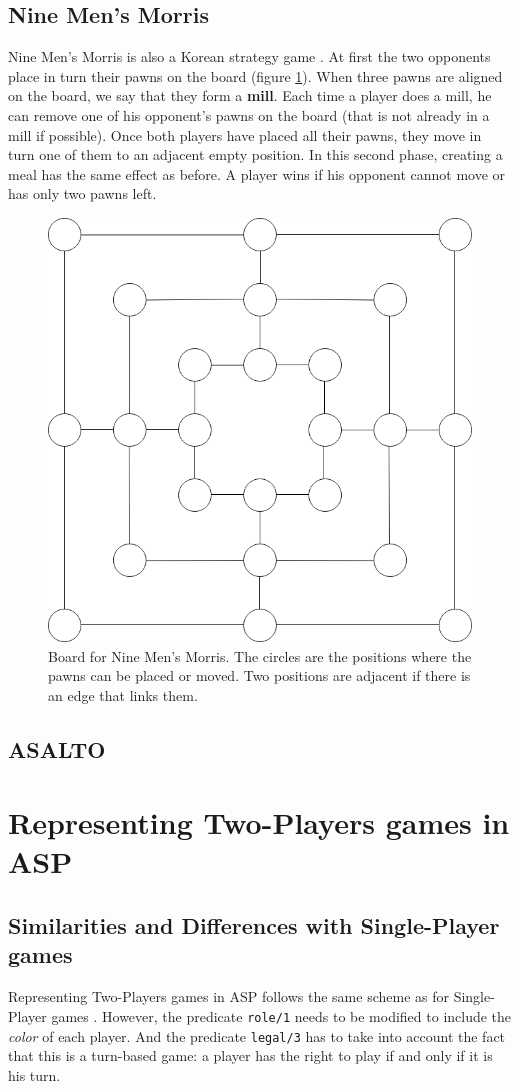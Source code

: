 \subsection{Nine Men's Morris}

Nine Men's Morris is also a Korean strategy game \citep{9MM_rules}. At first the two opponents place in turn their pawns on the board (figure \ref{fig:9MM_initial}). When three pawns are aligned on the board, we say that they form a \textbf{mill}. Each time a player does a mill, he can remove one of his opponent's pawns on the board (that is not already in a mill if possible). Once both players have placed all their pawns, they move in turn one of them to an adjacent empty position. In this second phase, creating a meal has the same effect as before. A player wins if his opponent cannot move or has only two pawns left.

\begin{figure}[h]
\centering
\includegraphics[width = 0.3\hsize]{figures/9MM_initial.png}
\caption{Board for Nine Men's Morris. The circles are the positions where the pawns can be placed or moved. Two positions are adjacent if there is an edge that links them.}
\label{fig:9MM_initial}
\end{figure}


\subsection{ASALTO}

\section{Representing Two-Players games in ASP}

\subsection{Similarities and Differences with Single-Player games}

Representing Two-Players games in ASP follows the same scheme as for Single-Player games \cite{thielscher2009answer}. However, the predicate \texttt{role/1} needs to be modified to include the \textit{color} of each player. And the predicate \texttt{legal/3} has to take into account the fact that this is a turn-based game: a player has the right to play if and only if it is his turn.

